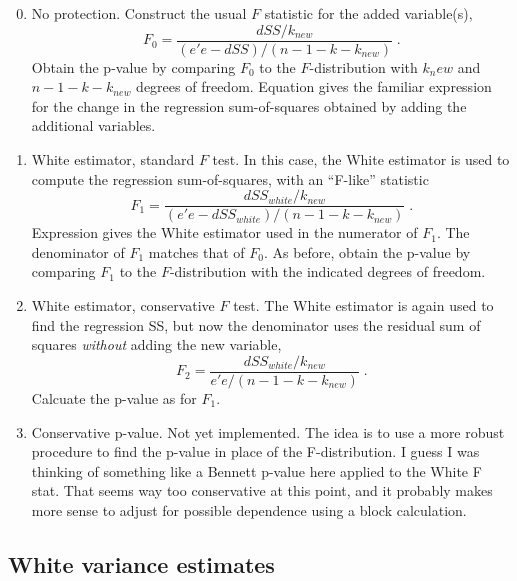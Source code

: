 \documentclass[12pt]{article}
\begin{document}
\begin{enumerate}
\setcounter{enumi}{-1}

\item No protection.  Construct the usual $F$ statistic for the added
 variable(s),
\begin{equation}
    F_0 = \frac{ dSS/k_{new} }{(e'e-dSS)/(n-1-k-k_{new})} \;.
\label{eq:f0}
\end{equation}
 Obtain the p-value by comparing $F_0$ to the $F$-distribution with $k_new$ and
 $n-1-k-k_{new}$ degrees of freedom.  Equation  gives the familiar
 expression for the change in the regression sum-of-squares obtained by adding
 the additional variables.

\item White estimator, standard $F$ test. In this case, the White estimator is
 used to compute the regression sum-of-squares, with an ``F-like'' statistic
\begin{equation}
    F_1 = \frac{ dSS_{white}/k_{new} }{(e'e-dSS_{white})/(n-1-k-k_{new})} \;.
\label{eq:f1}
\end{equation}
 Expression  gives the White estimator used in the numerator of
 $F_1$.  The denominator of $F_1$ matches that of $F_0$.  As before, obtain the
 p-value by comparing $F_1$ to the $F$-distribution with the indicated degrees
 of freedom.

\item White estimator, conservative $F$ test. The White estimator is again used
 to find the regression SS, but now the denominator uses the residual sum of
 squares {\em without} adding the new variable,
\begin{equation}
    F_2 = \frac{ dSS_{white}/k_{new} }{e'e/(n-1-k-k_{new})} \;.
\label{eq:fstat}
\end{equation}
 Calcuate the p-value as for $F_1$.

\item Conservative p-value.  Not yet implemented.  The idea is to use a more
 robust procedure to find the p-value in place of the F-distribution.  I guess I
 was thinking of something like a Bennett p-value here applied to the White F
 stat.  That seems way too conservative at this point, and it probably makes
 more sense to adjust for possible dependence using a block calculation.

\end{enumerate}

\subsection{White variance estimates} %
\end{document}
